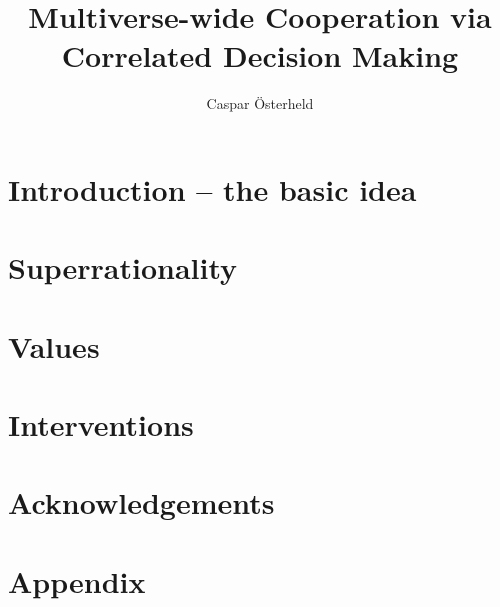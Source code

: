 \documentclass[]{article}
\title{Multiverse-wide Cooperation via Correlated Decision Making}
\author{Caspar \"Osterheld}
\date{}
\theoremstyle{plain}
\theoremstyle{plain}
\begin{document}
\maketitle

\begin{abstract}
\label{abstract}

\end{abstract}

\tableofcontents

\hypertarget{introduction-the-basic-idea}{\section{Introduction -- the
basic idea}\label{introduction-the-basic-idea}}
%

\hypertarget{superrationality}{\section{Superrationality}\label{superrationality}}


\hypertarget{values}{\section{Values}\label{values}}


\hypertarget{interventions}{\section{Interventions}\label{interventions}}


\section{Acknowledgements}\label{acknowledgements}


\section{Appendix}\label{appendix}


\begin{sloppypar} %
\printbibliography
\end{sloppypar}
\end{document}
